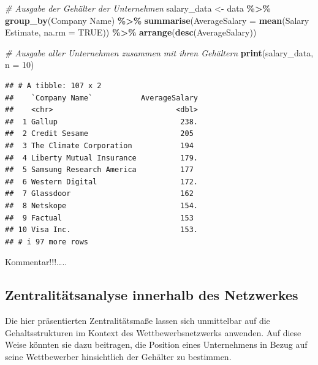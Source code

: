 \documentclass[
]{article}
\newenvironment{Shaded}{\begin{snugshade}}{\end{snugshade}}
\newcommand{\AttributeTok}[1]{\textcolor[rgb]{0.13,0.29,0.53}{#1}}
\newcommand{\CommentTok}[1]{\textcolor[rgb]{0.56,0.35,0.01}{\textit{#1}}}
\newcommand{\ConstantTok}[1]{\textcolor[rgb]{0.56,0.35,0.01}{#1}}
\newcommand{\DecValTok}[1]{\textcolor[rgb]{0.00,0.00,0.81}{#1}}
\newcommand{\FunctionTok}[1]{\textcolor[rgb]{0.13,0.29,0.53}{\textbf{#1}}}
\newcommand{\NormalTok}[1]{#1}
\newcommand{\OtherTok}[1]{\textcolor[rgb]{0.56,0.35,0.01}{#1}}
\newcommand{\SpecialCharTok}[1]{\textcolor[rgb]{0.81,0.36,0.00}{\textbf{#1}}}
\newcommand{\StringTok}[1]{\textcolor[rgb]{0.31,0.60,0.02}{#1}}
\begin{document}
\begin{Shaded}
\begin{Highlighting}[]
\CommentTok{\# Ausgabe der Gehälter der Unternehmen}
\NormalTok{salary\_data }\OtherTok{\textless{}{-}}\NormalTok{ data }\SpecialCharTok{\%\textgreater{}\%}
  \FunctionTok{group\_by}\NormalTok{(}\StringTok{\textasciigrave{}}\AttributeTok{Company Name}\StringTok{\textasciigrave{}}\NormalTok{) }\SpecialCharTok{\%\textgreater{}\%}
  \FunctionTok{summarise}\NormalTok{(}\AttributeTok{AverageSalary =} \FunctionTok{mean}\NormalTok{(}\StringTok{\textasciigrave{}}\AttributeTok{Salary Estimate}\StringTok{\textasciigrave{}}\NormalTok{, }\AttributeTok{na.rm =} \ConstantTok{TRUE}\NormalTok{)) }\SpecialCharTok{\%\textgreater{}\%}
  \FunctionTok{arrange}\NormalTok{(}\FunctionTok{desc}\NormalTok{(AverageSalary))}

\CommentTok{\# Ausgabe aller Unternehmen zusammen mit ihren Gehältern}
\FunctionTok{print}\NormalTok{(salary\_data, }\AttributeTok{n =} \DecValTok{10}\NormalTok{)}
\end{Highlighting}
\end{Shaded}

\begin{verbatim}
## # A tibble: 107 x 2
##    `Company Name`           AverageSalary
##    <chr>                            <dbl>
##  1 Gallup                            238.
##  2 Credit Sesame                     205 
##  3 The Climate Corporation           194 
##  4 Liberty Mutual Insurance          179.
##  5 Samsung Research America          177 
##  6 Western Digital                   172.
##  7 Glassdoor                         162 
##  8 Netskope                          154.
##  9 Factual                           153 
## 10 Visa Inc.                         153.
## # i 97 more rows
\end{verbatim}

Kommentar!!!\ldots..

\subsection{Zentralitätsanalyse innerhalb des
Netzwerkes}\label{zentralituxe4tsanalyse-innerhalb-des-netzwerkes}

Die hier präsentierten Zentralitätsmaße lassen sich unmittelbar auf die
Gehaltsstrukturen im Kontext des Wettbewerbsnetzwerks anwenden. Auf
diese Weise könnten sie dazu beitragen, die Position eines Unternehmens
in Bezug auf seine Wettbewerber hinsichtlich der Gehälter zu bestimmen.
\end{document}
